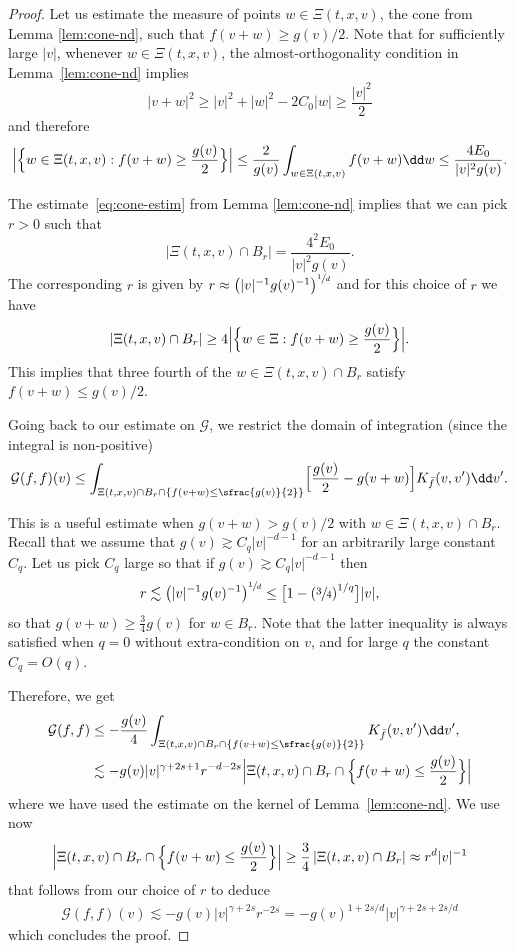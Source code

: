 \begin{proof}
Let us estimate the measure of points $w \in \Xi(t,x,v)$, the cone
from Lemma \ref{lem:cone-nd}, such that $f(v+w) \ge g(v)/2$. Note that
for sufficiently large $|v|$, whenever $w \in \Xi(t,x,v)$, the
almost-orthogonality condition in Lemma~\ref{lem:cone-nd} implies
\[
|v+w|^2 \geq |v|^2 + |w|^2 - 2 C_0|w| \geq \frac{|v|^2}{2}
\]
and therefore
\[
\Bigl|\Bigl\{ w \in \Xi(t,x,v) : f(v+w) \ge \frac{g(v)}{2} \Bigr\}\Bigr|
\le \frac2{g(v)} \int_{w \in \Xi(t,x,v)} f(v+w) \dd w \le \frac{4E_0}{|v|^2
g(v)}.
\]

The estimate~\eqref{eq:cone-estim} from Lemma \ref{lem:cone-nd}
implies that we can pick $r>0$ such that
\[
\left|\Xi(t,x,v) \cap B_r \right| = \frac{4^2E_0}{|v|^2 g(v)}.
\]
The corresponding $r$ is given by
$r \approx \left(|v|^{-1} g(v)^{-1}\right)^{\sfrac1d}$ and for this
choice of $r$ we have
\[
\left|\Xi(t,x,v) \cap B_r \right| \ge 4 \Bigl|\Bigl\{ w \in \Xi: f(v+w)
\ge \frac{g(v)}{2} \Bigr\}\Bigr|.
\]
This implies that three fourth of the $w \in \Xi(t,x,v) \cap B_r$ satisfy
$f(v+w) \le g(v)/2$.

Going back to our estimate on $\mathcal G$, we restrict the domain of
integration (since the integral is non-positive)
\[
\mathcal G(f,f)(v) \leq \int_{\Xi(t,x,v) \cap B_r \cap \left\{f(v+w) \le \sfrac{g(v)}{2}\right\}}
\Bigl[ \frac{g(v)}{2} - g(v+w) \Bigr] K_{\bar f}(v,v') \dd v'.
\]

This is a useful estimate when $g(v+w) > g(v)/2$ with
$w \in \Xi(t,x,v) \cap B_r$. Recall that we assume that
$g(v) \gtrsim C_q |v|^{-d-1}$ for an arbitrarily large constant
$C_q$. Let us pick $C_q$ large so that if
$g(v) \gtrsim C_q |v|^{-d-1}$ then
\[
r \lesssim \left(|v|^{-1} g(v)^{-1}\right)^{\sfrac1d} \leq \bigl[ 1-
\left( \sfrac{3}{4} \right)^{1/q} \bigr] |v|,
\]
so that $g(v+w) \geq \frac{3}{4} g(v)$ for $w \in B_r$. Note that the
latter inequality is always satisfied when $q=0$ without
extra-condition on $v$, and for large $q$ the constant $C_q=O(q)$.

Therefore, we get
\begin{align*}
\mathcal G(f,f)
&\leq -\frac{g(v)} 4 \int_{\Xi(t,x,v) \cap B_r \cap \left\{f(v+w) \le \sfrac{g(v)}{2}\right\}} K_{\bar f}(v,v') \dd v', \\
&\lesssim -g(v) |v|^{\gamma+2s+1} r^{-d-2s} \Bigl|\Xi(t,x,v) \cap B_r \cap
\Bigl\{f(v+w) \le \frac{g(v)}{2}\Bigr\}\Bigr|
\end{align*}
where we have used the estimate on the kernel of
Lemma~\ref{lem:cone-nd}. We use now
\[
\Bigl|\Xi(t,x,v) \cap B_r \cap \Bigl\{f(v+w) \le \frac{g(v)}{2} \Bigr\}\Bigr| \ge \frac34\, |\Xi(t,x,v) \cap
B_r| \approx r^d |v|^{-1}
\]
that follows from our choice of $r$ to deduce
\begin{align*}
\mathcal G(f,f)(v) \lesssim -g(v) |v|^{\gamma+2s} r^{-2s} =
- g(v)^{1+2s/d} |v|^{\gamma+2s+2s/d}
\end{align*}
which concludes the proof.
\end{proof}

